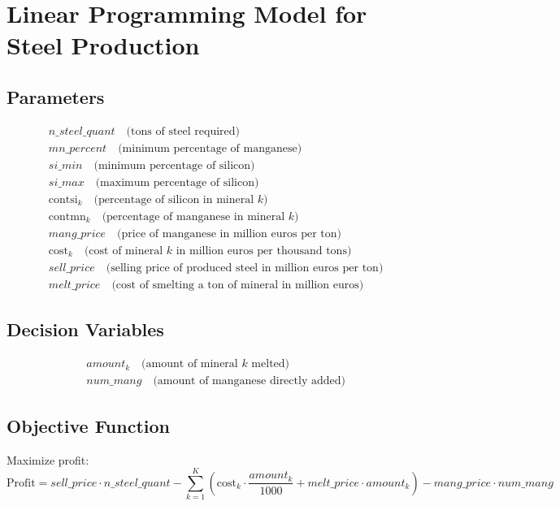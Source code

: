 \documentclass{article}
\begin{document}
\section*{Linear Programming Model for Steel Production}

\subsection*{Parameters}
\begin{align*}
& n\_steel\_quant \quad \text{(tons of steel required)} \\
& mn\_percent \quad \text{(minimum percentage of manganese)} \\
& si\_min \quad \text{(minimum percentage of silicon)} \\
& si\_max \quad \text{(maximum percentage of silicon)} \\
& \text{contsi}_k \quad \text{(percentage of silicon in mineral } k\text{)} \\
& \text{contmn}_k \quad \text{(percentage of manganese in mineral } k\text{)} \\
& mang\_price \quad \text{(price of manganese in million euros per ton)} \\
& \text{cost}_k \quad \text{(cost of mineral } k \text{ in million euros per thousand tons)} \\
& sell\_price \quad \text{(selling price of produced steel in million euros per ton)} \\
& melt\_price \quad \text{(cost of smelting a ton of mineral in million euros)}
\end{align*}

\subsection*{Decision Variables}
\begin{align*}
& amount_k \quad \text{(amount of mineral } k\text{ melted)} \\
& num\_mang \quad \text{(amount of manganese directly added)}
\end{align*}

\subsection*{Objective Function}
Maximize profit:
\[
\text{Profit} = sell\_price \cdot n\_steel\_quant - \sum_{k=1}^{K} \left( \text{cost}_k \cdot \frac{amount_k}{1000} + melt\_price \cdot amount_k \right) - mang\_price \cdot num\_mang
\]
\end{document}
